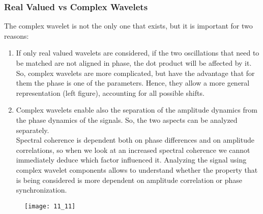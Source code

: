\subsubsection{Real Valued vs Complex Wavelets}
The complex wavelet is not the only one that exists, but it is important for two reasons:
\begin{enumerate}
    \item If only real valued wavelets are considered, if the two oscillations that need to be matched are not aligned in phase, the dot product will be affected by it.
    So, complex wavelets are more complicated, but have the advantage that for them the phase is one of the parameters. Hence, they allow a more general representation (left figure), accounting for all possible shifts. 
    \item Complex wavelets enable also the separation of the amplitude dynamics from the phase dynamics of the signals. So, the two aspects can be analyzed separately.\\
    Spectral coherence is dependent both on phase differences and on amplitude correlations, so when we look at an increased spectral coherence we cannot immediately deduce which factor influenced it. Analyzing the signal using complex wavelet components allows to understand whether the property that is being considered is more dependent on amplitude correlation or phase synchronization.
\end{enumerate}
\begin{figure}[H]
    \texttt{[image: 11\_11]}
    \centering
\end{figure}

